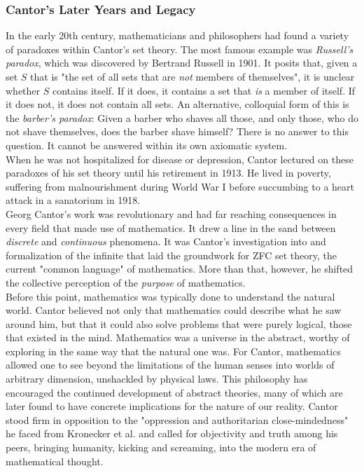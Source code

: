 \subsubsection{Cantor's Later Years and Legacy}

In the early 20th century, mathematicians and philosophers had found a variety of paradoxes within Cantor's set theory. The most famous example was \textit{Russell's paradox}, which was discovered by Bertrand Russell in 1901. It posits that, given a set $S$ that is "the set of all sets that are \textit{not} members of themselves", it is unclear whether $S$ contains itself. If it does, it contains a set that \textit{is} a member of itself. If it does not, it does not contain all sets. An alternative, colloquial form of this is the \textit{barber's paradox}: Given a barber who shaves all those, and only those, who do not shave themselves, does the barber shave himself? There is no answer to this question. It cannot be answered within its own axiomatic system. \\

When he was not hospitalized for disease or depression, Cantor lectured on these paradoxes of his set theory until his retirement in 1913. He lived in poverty, suffering from malnourishment during World War I before succumbing to a heart attack in a sanatorium in 1918. \\

Georg Cantor's work was revolutionary and had far reaching consequences in every field that made use of mathematics. It drew a line in the sand between \textit{discrete} and \textit{continuous} phenomena. It was Cantor's investigation into and formalization of the infinite that laid the groundwork for ZFC set theory, the current "common language" of mathematics. More than that, however, he shifted the collective perception of the \textit{purpose} of mathematics. \\

Before this point, mathematics was typically done to understand the natural world. Cantor believed not only that mathematics could describe what he saw around him, but that it could also solve problems that were purely logical, those that existed in the mind. Mathematics was a universe in the abstract, worthy of exploring in the same way that the natural one was. For Cantor, mathematics allowed one to see beyond the limitations of the human senses into worlds of arbitrary dimension, unshackled by physical laws. This philosophy has encouraged the continued development of abstract theories, many of which are later found to have concrete implications for the nature of our reality. Cantor stood firm in opposition to the "oppression and authoritarian close-mindedness" he faced from Kronecker et al. and called for objectivity and truth among his peers, bringing humanity, kicking and screaming, into the modern era of mathematical thought. \\

